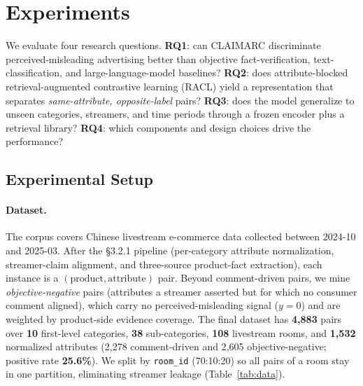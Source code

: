 \section{Experiments}
\label{sec:exp}

We evaluate four research questions. \textbf{RQ1}: can CLAIMARC discriminate
perceived-misleading advertising better than objective fact-verification,
text-classification, and large-language-model baselines? \textbf{RQ2}: does
attribute-blocked retrieval-augmented contrastive learning (RACL) yield a
representation that separates \emph{same-attribute, opposite-label} pairs?
\textbf{RQ3}: does the model generalize to unseen categories, streamers, and
time periods through a frozen encoder plus a retrieval library? \textbf{RQ4}:
which components and design choices drive the performance?

\subsection{Experimental Setup}
\label{sec:exp:setup}

\paragraph{Dataset.}
The corpus covers Chinese livestream e-commerce data collected between
2024-10 and 2025-03. After the \S3.2.1 pipeline (per-category attribute
normalization, streamer-claim alignment, and three-source product-fact
extraction), each instance is a $(\text{product},\text{attribute})$ pair. Beyond
comment-driven pairs, we mine \emph{objective-negative} pairs (attributes a
streamer asserted but for which no consumer comment aligned), which carry no
perceived-misleading signal ($y{=}0$) and are weighted by product-side evidence
coverage. The final dataset has \textbf{4{,}883} pairs over \textbf{10}
first-level categories, \textbf{38} sub-categories, \textbf{108} livestream
rooms, and \textbf{1{,}532} normalized attributes (2{,}278 comment-driven and
2{,}605 objective-negative; positive rate \textbf{25.6\%}). We split by
\texttt{room\_id} (70:10:20) so all pairs of a room stay in one partition,
eliminating streamer leakage (Table~\ref{tab:data}).

